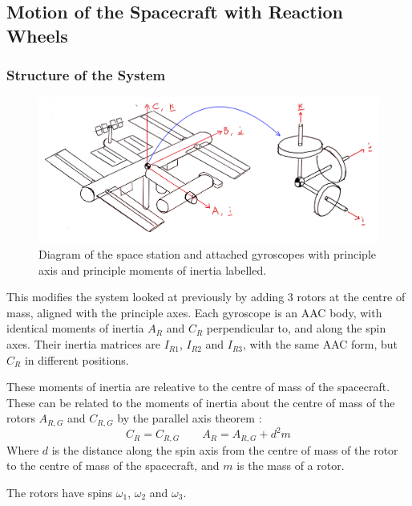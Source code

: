 \documentclass[12]{article}
\begin{document}
\begin{multicols*}{2}
\subsection{Motion of the Spacecraft with Reaction Wheels}

\subsubsection{Structure of the System}

\begin{figure}[H]
\centering
\includegraphics[width=\linewidth]{fig/space_station.png}
\vspace{-0.3cm}
\caption{\label{fig:space_station}Diagram of the space station and attached gyroscopes with principle axis and principle moments of inertia labelled.}
\end{figure}

This modifies the system looked at previously by adding 3 rotors at the centre of mass, aligned with the principle axes. Each gyroscope is an AAC body, with identical moments of inertia $A_R$ and $C_R$ perpendicular to, and along the spin axes. Their inertia matrices are $I_{R1}$, $I_{R2}$ and $I_{R3}$, with the same AAC form, but $C_R$ in different positions.

These moments of inertia are releative to the centre of mass of the spacecraft. These can be related to the moments of inertia about the centre of mass of the rotors $A_{R,G}$ and $C_{R,G}$ by the parallel axis theorem \cite{parallel_axis_theorem}:
\begin{equation} \label{eq:rotor_moments_of_inertia}
C_R = C_{R,G} \quad\quad A_R = A_{R,G} + d^2m
\end{equation}
Where $d$ is the distance along the spin axis from the centre of mass of the rotor to the centre of mass of the spacecraft, and $m$ is the mass of a rotor.

The rotors have spins $\omega_1$, $\omega_2$ and $\omega_3$.


\end{multicols*}
\end{document}
